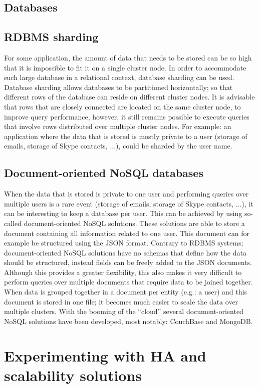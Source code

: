 \documentclass[12pt]{report}
\begin{document}
\section{Databases}
\section{RDBMS sharding}
For some application, the amount of data that needs to be stored can be so high
that it is impossible to fit it on a single cluster node. In order to
accommodate such large database in a relational context, database
sharding can be used. Database sharding allows databases to be
partitioned horizontally; so that different rows of the database can
reside on different cluster nodes. It is advisable that rows that are
closely connected are located on the same cluster node, to improve
query performance, however, it still remains possible to execute
queries that involve rows distributed over multiple cluster nodes.
For example: an application where the data that is stored is mostly 
private to a user (storage of emails, storage of Skype contacts, ...),
 could be sharded by the user name.
\section{Document-oriented NoSQL databases}
\label{sec:no_sql}
When the data that is stored is private to one user and performing
queries over multiple users is a rare event (storage of emails,
storage of Skype contacts, ...), it can be interesting to keep a
database per user. This can be achieved by using so-called
document-oriented NoSQL solutions. 
These solutions are able to store a document
containing all information related to one user. This document can for
example be structured using the JSON format. Contrary to RDBMS
systems; document-oriented NoSQL solutions have no schemas that define
how the data should be structured, instead fields can be freely added
to the JSON documents.
Although this provides a greater flexibility, this also makes it very
difficult to perform queries over multiple documents that require data
to be joined together.
When data is grouped together in a document per entity (e.g.: a user)
and this document is stored in one file; it becomes much easier to scale the data over
multiple clusters.
With the booming of the ``cloud'' several document-oriented NoSQL
solutions have been developed, most notably: CouchBase and MongoDB.

\chapter{Experimenting with HA and scalability solutions}
\end{document}
